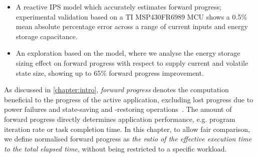 \begin{itemize}
    \item A reactive IPS model which accurately estimates forward progress; experimental validation based on a TI MSP430FR6989 MCU shows a 0.5\% mean absolute percentage error across a range of current inputs and energy storage capacitance. 
	\item An exploration based on the model, where we analyse the energy storage sizing effect on forward progress with respect to supply current and volatile state size, showing up to 65\% forward progress improvement.


\end{itemize}

As discussed in \cref{chapter:intro}, \textit{forward progress} denotes the computation beneficial to the progress of the active application, excluding lost progress due to power failures and state-saving and -restoring operations~\cite{7478428}. 
The amount of forward progress directly determines application performance, e.g. program iteration rate or task completion time. 
In this chapter, to allow fair comparison, we define normalised forward progress as \textit{the ratio of the effective execution time to the total elapsed time}, without being restricted to a specific workload. 

